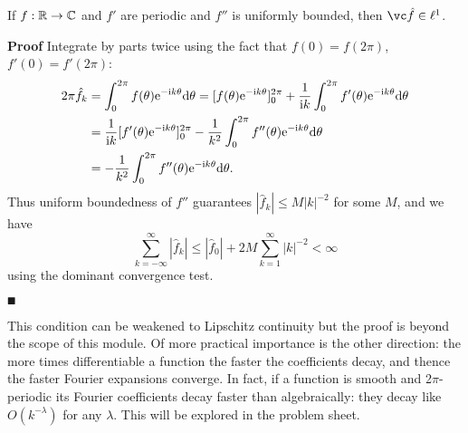 \begin{lemma} If $f : {\mathbb R} \rightarrow {\mathbb C}$ and $f'$ are periodic  and $f''$ is uniformly bounded, then $\vchatf \ensuremath{\in} \ensuremath{\ell}^1$.

\end{lemma}
\textbf{Proof} Integrate by parts twice using the fact that $f(0) = f(2\ensuremath{\pi})$, $f'(0) = f'(2\ensuremath{\pi})$:
\begin{align*}
2\ensuremath{\pi}\hat f_k &= \ensuremath{\int}_0^{2\ensuremath{\pi}} f(\ensuremath{\theta}) {\rm e}^{-{\rm i} k \ensuremath{\theta}} {\rm d}\ensuremath{\theta} =
[f(\ensuremath{\theta}) {\rm e}^{-{\rm i} k \ensuremath{\theta}}]_0^{2\ensuremath{\pi}} + {1 \over {\rm i} k} \ensuremath{\int}_0^{2\ensuremath{\pi}} f'(\ensuremath{\theta}) {\rm e}^{-{\rm i} k \ensuremath{\theta}} {\rm d}\ensuremath{\theta} \\
&= {1 \over {\rm i} k} [f'(\ensuremath{\theta}) {\rm e}^{-{\rm i} k \ensuremath{\theta}}]_0^{2\ensuremath{\pi}} - {1 \over k^2} \ensuremath{\int}_0^{2\ensuremath{\pi}} f''(\ensuremath{\theta}) {\rm e}^{-{\rm i} k \ensuremath{\theta}} {\rm d}\ensuremath{\theta} \\
&= - {1 \over k^2} \ensuremath{\int}_0^{2\ensuremath{\pi}} f''(\ensuremath{\theta}) {\rm e}^{-{\rm i} k \ensuremath{\theta}} {\rm d}\ensuremath{\theta}.
\end{align*}
Thus uniform boundedness of $f''$ guarantees $|\hat f_k| \ensuremath{\leq} M |k|^{-2}$ for some $M$, and we have
\[
\ensuremath{\sum}_{k = -\ensuremath{\infty}}^\ensuremath{\infty} |\hat f_k| \ensuremath{\leq} |\hat f_0|  + 2M \ensuremath{\sum}_{k = 1}^\ensuremath{\infty} |k|^{-2}  < \ensuremath{\infty}
\]
using the dominant convergence test.

\ensuremath{\QED}

This condition can be weakened to Lipschitz continuity but the proof is  beyond the scope of this module. Of more practical importance is the other direction: the more times differentiable a function the faster the coefficients decay, and thence the faster Fourier expansions converge. In fact, if a function is smooth and 2\ensuremath{\pi}-periodic its Fourier coefficients decay faster than algebraically: they decay like $O(k^{-\ensuremath{\lambda}})$ for any $\ensuremath{\lambda}$. This will be explored in the problem sheet.

